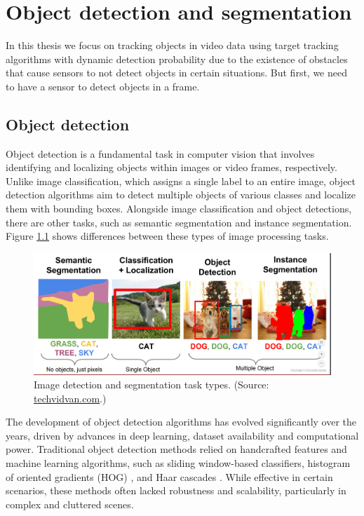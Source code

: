 \chapter{Object detection and segmentation}
In this thesis we focus on tracking objects in video data using target tracking algorithms with dynamic detection probability due to the existence of obstacles that cause sensors to not detect objects in certain situations. But first, we need to have a sensor to detect objects in a
frame.


\section{Object detection}
Object detection is a fundamental task in computer vision that involves identifying and localizing objects
within images or video frames, respectively. Unlike image classification, which assigns a single label to an entire
image, object
detection algorithms aim to detect multiple objects of various classes and localize them with bounding boxes.
Alongside image classification and object detections, there are other tasks, such as semantic segmentation and
instance segmentation. Figure \ref{fig:seg_type} shows differences between these types of image processing tasks.

\begin{figure}
  \centering
  \includegraphics[width=\linewidth]{text/chapter_03/imgs/segmentation-types}
  \caption{Image detection and segmentation task types. (Source: \href{https://techvidvan.com/tutorials/image-segmentation-machine-learning/}{techvidvan.com}.)}
  \label{fig:seg_type}
\end{figure}

The development of object detection algorithms has evolved significantly over the years, driven by advances in deep
learning, dataset availability and computational power. Traditional object detection methods relied on handcrafted
features and machine learning algorithms, such as sliding window-based classifiers, histogram of oriented gradients (HOG) \cite{HoOGDalal2005}, and Haar cascades \cite{HaarCascadesLi2016}. While effective in certain scenarios, these methods often lacked robustness and scalability, particularly in complex and cluttered scenes.

